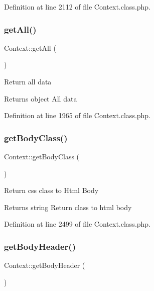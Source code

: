 Definition at line 2112 of file Context.\+class.\+php.

\hypertarget{classContext_a89ad6fd5c093e257e82822d16dc67ac4}{}\label{classContext_a89ad6fd5c093e257e82822d16dc67ac4} 
\subsubsection{\texorpdfstring{get\+All()}{getAll()}}
{\footnotesize\ttfamily Context\+::get\+All (\begin{DoxyParamCaption}{ }\end{DoxyParamCaption})}

Return all data

\begin{DoxyReturn}{Returns}
object All data 
\end{DoxyReturn}


Definition at line 1965 of file Context.\+class.\+php.

\hypertarget{classContext_a6562a2a894b2142362640e512bcf4e09}{}\label{classContext_a6562a2a894b2142362640e512bcf4e09} 
\subsubsection{\texorpdfstring{get\+Body\+Class()}{getBodyClass()}}
{\footnotesize\ttfamily Context\+::get\+Body\+Class (\begin{DoxyParamCaption}{ }\end{DoxyParamCaption})}

Return css class to Html Body

\begin{DoxyReturn}{Returns}
string Return class to html body 
\end{DoxyReturn}


Definition at line 2499 of file Context.\+class.\+php.

\hypertarget{classContext_a991c9fc6985b78d817b6771092913975}{}\label{classContext_a991c9fc6985b78d817b6771092913975} 
\subsubsection{\texorpdfstring{get\+Body\+Header()}{getBodyHeader()}}
{\footnotesize\ttfamily Context\+::get\+Body\+Header (\begin{DoxyParamCaption}{ }\end{DoxyParamCaption})}

